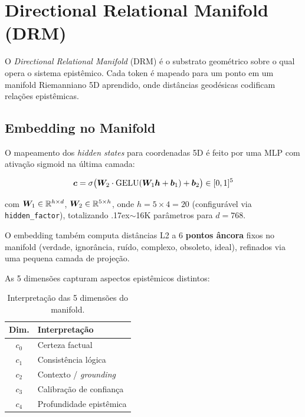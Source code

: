 
\section{Directional Relational Manifold (DRM)}
\label{sec:drm}

O \textit{Directional Relational Manifold} (DRM) \'e o substrato
geom\'etrico sobre o qual opera o sistema epist\^emico. Cada token \'e
mapeado para um ponto em um manifold Riemanniano 5D aprendido, onde
dist\^ancias geod\'esicas codificam rela\c{c}\~oes epist\^emicas.

\subsection{Embedding no Manifold}

O mapeamento dos \textit{hidden states} para coordenadas 5D \'e feito por
uma MLP com ativa\c{c}\~ao sigmoid na \'ultima camada:

\begin{equation}
    \bm{c} = \sigma\big(\bm{W}_2 \cdot \text{GELU}(\bm{W}_1 \bm{h} + \bm{b}_1) + \bm{b}_2\big) \in [0, 1]^5
    \label{eq:manifold_emb}
\end{equation}

com $\bm{W}_1 \in \mathbb{R}^{h \times d}$, $\bm{W}_2 \in \mathbb{R}^{5 \times h}$,
onde $h = 5 \times 4 = 20$ (configur\'avel via \texttt{hidden\_factor}),
totalizando {\raise.17ex\hbox{$\scriptstyle\sim$}}16K par\^ametros para $d = 768$.

O embedding tamb\'em computa dist\^ancias L2 a 6 \textbf{pontos \^ancora}
fixos no manifold (verdade, ignor\^ancia, ru\'ido, complexo, obsoleto,
ideal), refinados via uma pequena camada de proje\c{c}\~ao.

As 5 dimens\~oes capturam aspectos epist\^emicos distintos:

\begin{table}[H]
\centering
\caption{Interpreta\c{c}\~ao das 5 dimens\~oes do manifold.}
\label{tab:dims_5d}
\begin{tabular}{cl}
\toprule
\textbf{Dim.} & \textbf{Interpreta\c{c}\~ao} \\
\midrule
$c_0$ & Certeza factual \\
$c_1$ & Consist\^encia l\'ogica \\
$c_2$ & Contexto / \textit{grounding} \\
$c_3$ & Calibra\c{c}\~ao de confian\c{c}a \\
$c_4$ & Profundidade epist\^emica \\
\bottomrule
\end{tabular}
\end{table}

